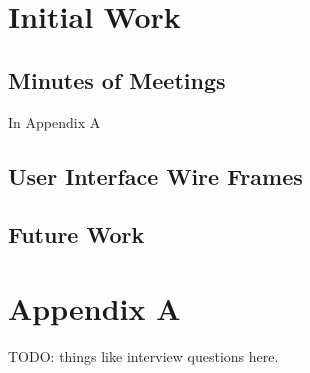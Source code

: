 \documentclass[11pt,a4paper]{article}
\begin{document}
\section{Initial Work}
\label{sec:initial-work}

\subsection{Minutes of Meetings}
In Appendix A
\subsection{User Interface Wire Frames}
\subsection{Future Work}
\label{sec:future-work}

\section{Appendix A}
TODO: things like interview questions here. 

\newpage


\end{document}
